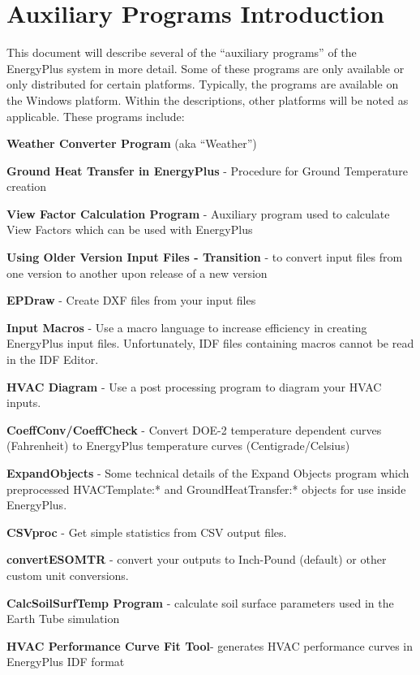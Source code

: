 

\chapter{Auxiliary Programs Introduction}\label{auxiliary-programs-introduction}

This document will describe several of the ``auxiliary programs'' of the EnergyPlus system in more detail. Some of these programs are only available or only distributed for certain platforms. Typically, the programs are available on the Windows platform. Within the descriptions, other platforms will be noted as applicable. These programs include:

\textbf{Weather Converter Program} (aka ``Weather'')

\textbf{Ground Heat Transfer in EnergyPlus} - Procedure for Ground Temperature creation

\textbf{View Factor Calculation Program} - Auxiliary program used to calculate View Factors which can be used with EnergyPlus

\textbf{Using Older Version Input Files - Transition} - to convert input files from one version to another upon release of a new version

\textbf{EPDraw} - Create DXF files from your input files

\textbf{Input Macros} - Use a macro language to increase efficiency in creating EnergyPlus input files. Unfortunately, IDF files containing macros cannot be read in the IDF Editor.

\textbf{HVAC Diagram} - Use a post processing program to diagram your HVAC inputs.

\textbf{CoeffConv/CoeffCheck} - Convert DOE-2 temperature dependent curves (Fahrenheit) to EnergyPlus temperature curves (Centigrade/Celsius)

\textbf{ExpandObjects} - Some technical details of the Expand Objects program which preprocessed HVACTemplate:* and GroundHeatTransfer:* objects for use inside EnergyPlus.

\textbf{CSVproc} - Get simple statistics from CSV output files.

\textbf{convertESOMTR} - convert your outputs to Inch-Pound (default) or other custom unit conversions.

\textbf{CalcSoilSurfTemp Program} - calculate soil surface parameters used in the Earth Tube simulation

\textbf{HVAC Performance Curve Fit Tool}- generates HVAC performance curves in EnergyPlus IDF format

